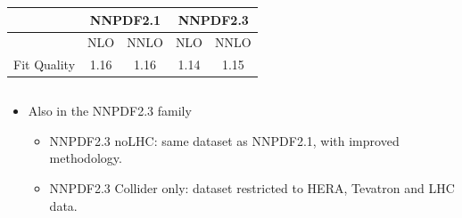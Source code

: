 \documentclass[10pt]{beamer}
\begin{document}
\begin{frame}
\begin{columns}
\begin{column}{0.5\textwidth}
\begin{table}
\scriptsize
\begin{tabular}{|c|c|c||c|c|}
\hline 
& \multicolumn{2}{c||}{\bf NNPDF2.1} & \multicolumn{2}{|c|}{\bf NNPDF2.3}  \\
\hline 
\hline 
  & NLO & NNLO  & NLO  & NNLO  \\
\hline 
Fit Quality  & 1.16 & 1.16  & 1.14 & 1.15     \\
\hline
\end{tabular}
\end{table}

  \end{column}
\end{columns}









\begin{itemize}
\item<2->Also in the NNPDF2.3 family
\begin{itemize}
 \item<1-> NNPDF2.3 noLHC:  same dataset as NNPDF2.1, with improved methodology.
  \item<1->  NNPDF2.3 Collider only: dataset restricted to HERA, Tevatron and LHC data.
\end{itemize}
\end{itemize}
\end{frame}
\end{document}
